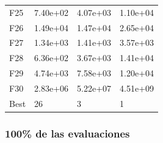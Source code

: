 \begin{table}[H]
\begin{minipage}{.5\linewidth}
\begin{tabular}{llll}
        F25  &  7.40e+02 &   4.07e+03 &  1.10e+04 \\
        F26  &  1.49e+04 &   1.47e+04 &  2.65e+04 \\
        F27  &  1.34e+03 &   1.41e+03 &  3.57e+03 \\
        F28  &  6.36e+02 &   3.67e+03 &  1.41e+04 \\
        F29  &  4.74e+03 &   7.58e+03 &  1.20e+04 \\
        F30  &  2.83e+06 &   5.22e+07 &  4.51e+09 \\
        Best &        26 &          3 &         1 \\
        \bottomrule
        \end{tabular}
        
    \end{minipage} 
\end{table}


\subsubsection*{100\% de las evaluaciones}


